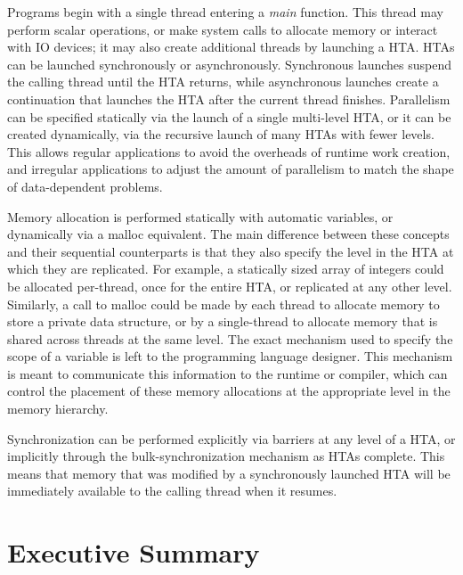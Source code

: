 \documentclass[conference, 10pt]{IEEEtran}
\begin{document}
Programs begin with a single thread entering a \textit{main} function.  This
thread may perform scalar operations, or make system calls to allocate memory or
interact with IO devices; it may also create additional threads by launching a
HTA.  HTAs can be launched synchronously or asynchronously.  Synchronous
launches suspend the calling thread until the HTA returns, while asynchronous
launches create a continuation that launches the HTA after the current thread
finishes.  Parallelism can be specified statically via the launch of a single
multi-level HTA, or it can be created dynamically, via the recursive launch of
many HTAs with fewer levels.  This allows regular applications to avoid the
overheads of runtime work creation, and irregular applications to adjust the
amount of parallelism to match the shape of data-dependent problems.

Memory allocation is performed statically with automatic variables, or
dynamically via a malloc equivalent.  The main difference between these concepts
and their sequential counterparts is that they also specify the level in the HTA
at which they are replicated.  For example, a statically sized array of integers
could be allocated per-thread, once for the entire HTA, or replicated at any
other level.  Similarly, a call to malloc could be made by each thread to
allocate memory to store a private data structure, or by a single-thread to
allocate memory that is shared across threads at the same level.  
The exact mechanism used to specify the scope of a variable is left to the 
programming language designer.  This mechanism is meant to communicate this 
information to the runtime or compiler, which can control the placement of these
memory allocations at the appropriate level in the memory hierarchy.

Synchronization can be performed explicitly via barriers at any level of a HTA,
or implicitly through the bulk-synchronization mechanism as HTAs complete.  This
means that memory that was modified by a synchronously launched HTA will be 
immediately available to the calling thread when it resumes.  



\section{Executive Summary}
\label{sec:summary}
\end{document}
